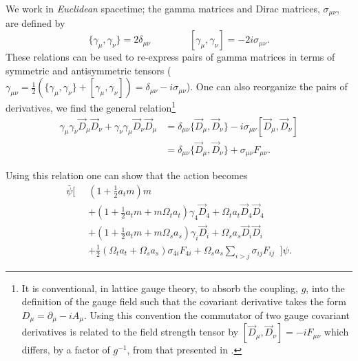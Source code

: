 We work in \emph{Euclidean} spacetime; the gamma matrices and Dirac matrices, $\sigma_{\mu\nu}$, are defined by 
\begin{equation*}
\{ \gamma_\mu , \gamma_\nu \} =2 \delta_{\mu\nu} \qquad \qquad \left[ \gamma_\mu , \gamma_\nu \right]  = -2i \sigma_{\mu\nu}. 
\end{equation*}
These relations can be used to re-express pairs of gamma matrices in terms of symmetric and antisymmetric tensors ( $\gamma_{\mu\nu} = \frac{1}{2}\left( \{\gamma_\mu , \gamma_\nu \}  + \left[ \gamma_\mu , \gamma_\nu \right]  \right) = \delta_{\mu\nu} - i \sigma_{\mu\nu}$). One can also reorganize the pairs of derivatives, we find the general relation\footnote{ It is conventional, in lattice gauge theory, to absorb the coupling, $g$, into the definition of the gauge field such that the covariant derivative takes the form $D_\mu = \partial_\mu -i A_\mu$. Using this convention the commutator of two gauge covariant derivatives is related to the field strength tensor by $ \left[  \overrightarrow{D}_\mu,\overrightarrow{D}_\nu \right] = -i  F_{\mu\nu}$ which differs, by a factor of $g^{-1}$, from that presented in . }
\begin{align*}
\gamma_\mu \gamma_\nu \overrightarrow{D}_\mu\overrightarrow{D}_\nu + \gamma_\nu \gamma_\mu \overrightarrow{D}_\nu\overrightarrow{D}_\mu &= \delta_{\mu\nu} \{ \overrightarrow{D}_\mu,\overrightarrow{D}_\nu\} - i \sigma_{\mu\nu} \left[  \overrightarrow{D}_\mu,\overrightarrow{D}_\nu \right] \\
&= \delta_{\mu\nu} \{ \overrightarrow{D}_\mu,\overrightarrow{D}_\nu\} +  \sigma_{\mu\nu} F_{\mu\nu}.
\end{align*} 

Using this relation one can show that the action becomes
\begin{align*}
\bar{\psi} \Bigg[ \;\;&\left( 1 + \frac{1}{2}a_t m \right) m  \\
& + \left( 1 + \frac{1}{2} a_t m + m\Omega_t a_t\right) \gamma_4 \overrightarrow{D}_4  + \Omega_t a_t \overrightarrow{D}_4\overrightarrow{D}_4\\
& + \left( 1 + \frac{1}{2} a_t m + m\Omega_s a_s\right) \gamma_i \overrightarrow{D}_i   + \Omega_s a_s \overrightarrow{D}_i\overrightarrow{D}_i\\
& + \frac{1}{2}\left( \Omega_t a_t + \Omega_s a_s \right) \sigma_{4i} F_{4i} + \Omega_s a_s \sum_{i>j} \sigma_{ij} F_{ij} \;\;\Bigg] \psi. 
\end{align*}

